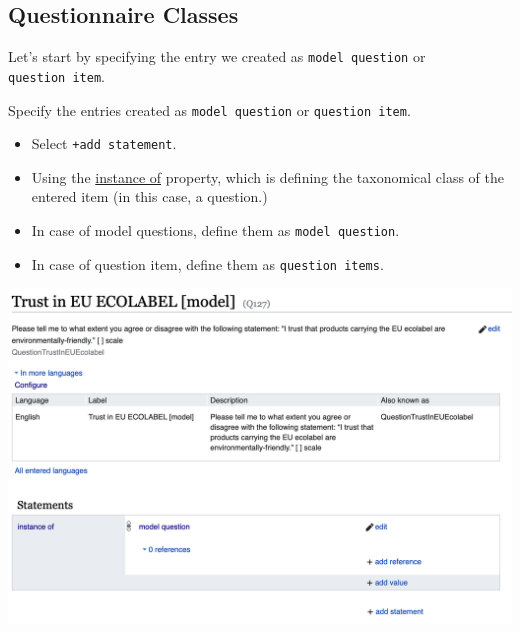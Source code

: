 \documentclass[
  letterpaper,
  DIV=11,
  numbers=noendperiod]{scrreprt}
\begin{document}
\subsection{Questionnaire Classes}\label{questionnaire-classes}

Let's start by specifying the entry we created as
\texttt{model\ question} or \texttt{question\ item}.

Specify the entries created as \texttt{model\ question} or
\texttt{question\ item}.

\begin{itemize}
\item
  Select \texttt{+add\ statement}.
\item
  Using the
  \href{https://reprexbase.eu/demowiki/index.php?title=Property:P2}{instance
  of} property, which is defining the taxonomical class of the entered
  item (in this case, a question.)
\item
  In case of model questions, define them as \texttt{model\ question}.
\item
  In case of question item, define them as \texttt{question\ items}.
\end{itemize}

\begin{center}
\includegraphics{png/question_to_wikibase/instanceOf_modelQuestion_6x4.png}
\end{center}

\begin{tcolorbox}[enhanced jigsaw, opacityback=0, bottomrule=.15mm, rightrule=.15mm, toptitle=1mm, breakable, colbacktitle=quarto-callout-caution-color!10!white, colback=white, title=\textcolor{quarto-callout-caution-color}{\faFire}\hspace{0.5em}{In the case of questions items, always link them to the appropriate
model questions using the
\href{https://reprexbase.eu/demowiki/index.php?title=Property:P266}{model
question (P266)} property.}, leftrule=.75mm, toprule=.15mm, left=2mm, arc=.35mm, colframe=quarto-callout-caution-color-frame, coltitle=black, titlerule=0mm, bottomtitle=1mm, opacitybacktitle=0.6]

\end{tcolorbox}
\end{document}
